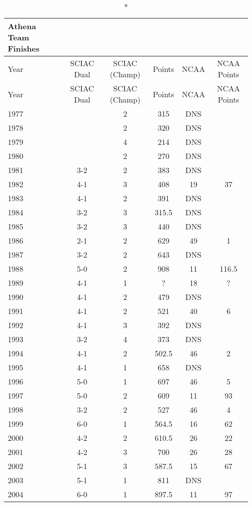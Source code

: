 \begin{longtable}{lccccc}
\caption*{Athena Team Finishes} \\
\toprule
Year & SCIAC Dual & SCIAC (Champ) & Points & NCAA & NCAA Points \\
\midrule
\endfirsthead

\toprule
Year & SCIAC Dual & SCIAC (Champ) & Points & NCAA & NCAA Points \\
\midrule
\endhead

\bottomrule
\endfoot

1977 &  & 2 & 315 & DNS &  \\
1978 &  & 2 & 320 & DNS &  \\
1979 &  & 4 & 214 & DNS &  \\
1980 &  & 2 & 270 & DNS &  \\
1981 & 3-2 & 2 & 383 & DNS &  \\
1982 & 4-1 & 3 & 408 & 19 & 37 \\
1983 & 4-1 & 2 & 391 & DNS &  \\
1984 & 3-2 & 3 & 315.5 & DNS &  \\
1985 & 3-2 & 3 & 440 & DNS &  \\
1986 & 2-1 & 2 & 629 & 49 & 1 \\
1987 & 3-2 & 2 & 643 & DNS &  \\
1988 & 5-0 & 2 & 908 & 11 & 116.5 \\
1989 & 4-1 & 1 & ? & 18 & ? \\
1990 & 4-1 & 2 & 479 & DNS &  \\
1991 & 4-1 & 2 & 521 & 40 & 6 \\
1992 & 4-1 & 3 & 392 & DNS &  \\
1993 & 3-2 & 4 & 373 & DNS &  \\
1994 & 4-1 & 2 & 502.5 & 46 & 2 \\
1995 & 4-1 & 1 & 658 & DNS &  \\
1996 & 5-0 & 1 & 697 & 46 & 5 \\
1997 & 5-0 & 2 & 609 & 11 & 93 \\
1998 & 3-2 & 2 & 527 & 46 & 4 \\
1999 & 6-0 & 1 & 564.5 & 16 & 62 \\
2000 & 4-2 & 2 & 610.5 & 26 & 22 \\
2001 & 4-2 & 3 & 700 & 26 & 28 \\
2002 & 5-1 & 3 & 587.5 & 15 & 67 \\
2003 & 5-1 & 1 & 811 & DNS &  \\
2004 & 6-0 & 1 & 897.5 & 11 & 97 \\

\end{longtable}
